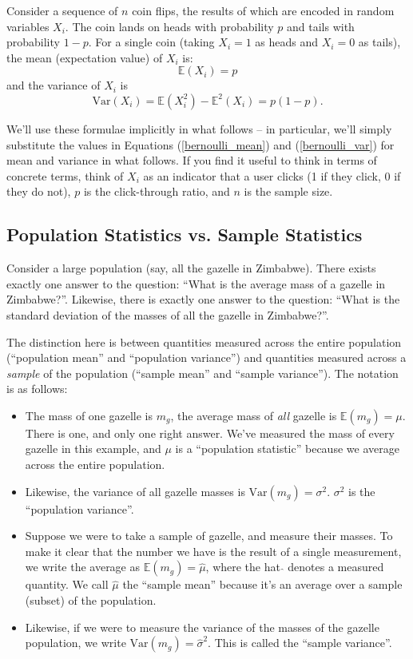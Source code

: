 \documentclass{article}
\numberwithin{equation}{section}
\begin{document}
Consider a sequence of $n$ coin flips, the results of which are encoded in random variables $X_i$. The coin lands on heads with probability $p$ and tails with probability $1-p$. For a single coin (taking $X_i = 1$ as heads and $X_i = 0$ as tails), the mean (expectation value) of $X_i$ is: 
\begin{equation} \label{bernoulli_mean}
	\mathbb{E}(X_i) = p
\end{equation}
and the variance of $X_i$ is 
\begin{equation} \label{bernoulli_var}	
	\mathrm{Var}(X_i) = \mathbb{E}(X_i^2) - \mathbb{E}^2(X_i) = p(1-p).
\end{equation}

We'll use these formulae implicitly in what follows -- in particular, we'll simply substitute the values in Equations (\ref{bernoulli_mean}) and (\ref{bernoulli_var}) for mean and variance in what follows. If you find it useful to think in terms of concrete terms, think of $X_i$ as an indicator that a user clicks (1 if they click, 0 if they do not), $p$ is the click-through ratio, and $n$ is the sample size.

\subsection{Population Statistics vs. Sample Statistics}

Consider a large population (say, all the gazelle in Zimbabwe). There exists exactly one answer to the question: ``What is the average mass of a gazelle in Zimbabwe?''. Likewise, there is exactly one answer to the question: ``What is the standard deviation of the masses of all the gazelle in Zimbabwe?''.  

The distinction here is between quantities measured across the entire population (``population mean'' and ``population variance'') and quantities measured across a \textit{sample} of the population (``sample mean'' and ``sample variance''). The notation is as follows:
\begin{itemize}
	\item The mass of one gazelle is $m_g$, the average mass of \textit{all} gazelle is $\mathbb{E}(m_g) = \mu$. There is one, and only one right answer. We've measured the mass of every gazelle in this example, and $\mu$ is a ``population statistic'' because we average across the entire population.
	\item Likewise, the variance of all gazelle masses is $\mathrm{Var}(m_g) = \sigma^2$. $\sigma^2$ is the ``population variance''.
	\item Suppose we were to take a sample of gazelle, and measure their masses. To make it clear that the number we have is the result of a single measurement, we write the average as $\mathbb{E}(m_g) = \hat{\mu}$, where the hat $\hat{ }$ denotes a measured quantity. We call $\hat{\mu}$ the ``sample mean'' because it's an average over a sample (subset) of the population.
	\item Likewise, if we were to measure the variance of the masses of the gazelle population, we write $\mathrm{Var}(m_g) = \hat{\sigma}^2$. This is called the ``sample variance''.
\end{itemize}
\end{document}
